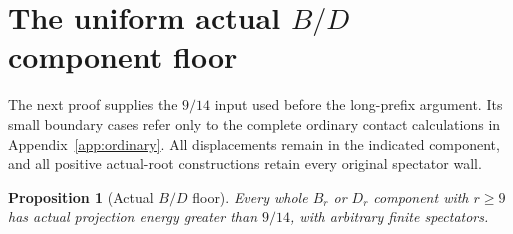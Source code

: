 \documentclass[11pt]{article}
\newtheorem{proposition}[theorem]{Proposition}
\theoremstyle{definition}
\theoremstyle{remark}
\begin{document}
\section[The uniform actual B/D component floor]{The uniform actual \(B/D\) component floor}
\label{app:BDfloor}
The next proof supplies the \(9/14\) input used before the long-prefix
argument. Its small boundary cases refer only to the complete ordinary
contact calculations in Appendix~\ref{app:ordinary}. All displacements
remain in the indicated component, and all positive actual-root
constructions retain every original spectator wall.

\begin{proposition}[Actual $B/D$ floor]\label{app:prop:BDnine}
Every whole $B_r$ or $D_r$ component with $r\ge9$ has actual
projection energy greater than $9/14$, with arbitrary finite
spectators.
\end{proposition}
\end{document}
